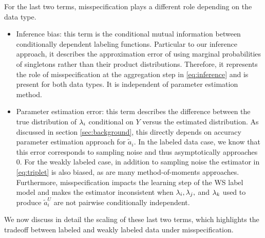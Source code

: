 For the last two terms, misspecification plays a different role depending on the data type. 
\begin{itemize}
    \item Inference bias: this term is the conditional mutual information between conditionally dependent labeling functions. Particular to our inference approach, it describes the approximation error of using marginal probabilities of singletons rather than their product distributions. Therefore, it represents the role of misspecification at the aggregation step in \eqref{eq:inference} and is present for both data types. It is independent of parameter estimation method.
    \item Parameter estimation error: this term describes the difference between the true distribution of $\lambda_i$ conditional on $Y$ versus the estimated distribution. As discussed in section \ref{sec:background}, this directly depends on accuracy parameter estimation approach for $\widetilde{a}_i$. In the labeled data case, we know that this error corresponds to sampling noise and thus asymptotically approaches $0$. For the weakly labeled case, in addition to sampling noise the estimator in \eqref{eq:triplet} is also biased, as are many method-of-moments approaches. Furthermore, misspecification impacts the learning step of the WS label model and makes the estimator inconsistent when $\lambda_i, \lambda_j,$ and $\lambda_k$ used to produce $\widetilde{a}_i^U$ are not pairwise conditionally independent.
\end{itemize}

We now discuss in detail the scaling of these last two terms, which highlights the tradeoff between labeled and weakly labeled data under misspecification.



